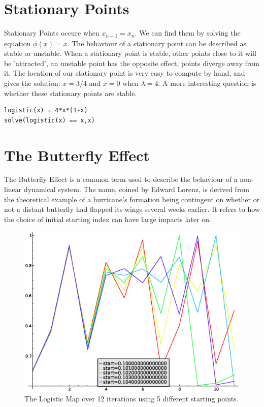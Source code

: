 \documentclass[a4paper]{article}
\begin{document}
\section{Stationary Points}
Stationary Points occure when $x_{n+1}=x_n$. We can find them by solving the equation $\phi(x)=x$. The behaviour of a stationary point can be described as stable or unstable. When a stationary point is stable, other points close to it will be 'attracted', an unstable point has the opposite effect, points diverge away from it. The location of our stationary point is very easy to compute by hand, and gives the solution: $x=3/4$ and $x=0$ when $\lambda =4$. A more interesting question is whether these stationary points are stable.

\begin{verbatim}
logistic(x) = 4*x*(1-x)
solve(logistic(x) == x,x)
\end{verbatim}


\section{The Butterfly Effect}
The Butterfly Effect is a common term used to describe the behaviour of a non-linear dynamical system. The name, coined by Edward Lorenz, is derived from the theoretical example of a hurricane's formation being contingent on whether or not a distant butterfly had flapped its wings several weeks earlier.\cite{wiki:xxx} It refers to how the choice of initial starting index can have large impacts later on.
\begin{figure}[htdp]
\begin{center}
\includegraphics[scale=0.5]{images/butterflyeffect}
\end{center}
\caption{The Logistic Map over 12 iterations using 5 different starting points.}
\label{butterflyeffect}
\end{figure}



\end{document}

